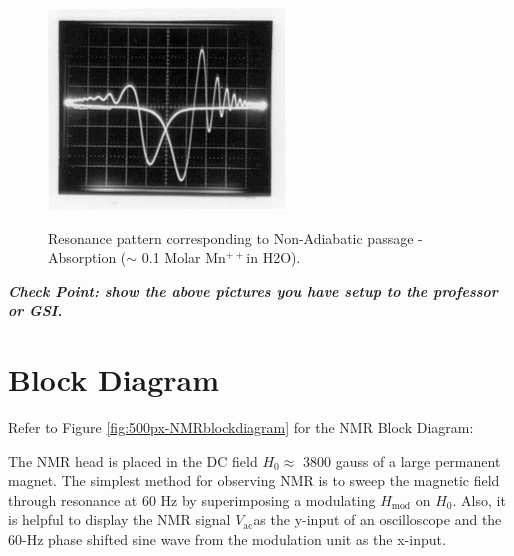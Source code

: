 \documentclass{../lab}
\begin{document}
\begin{figure}[h]
\begin{minipage}[t]{0.31\textwidth}
    \label{fig:AdiabaticDispersion}
\end{minipage}\hfill
\begin{minipage}[t]{0.31\textwidth}
    \href{http://experimentationlab.berkeley.edu/sites/default/files/images/NMR19.gif}{\includegraphics[width=\linewidth]{images/NMR19.png}}
    \caption{Resonance pattern corresponding to Non-Adiabatic passage - Absorption ($\sim$ 0.1 Molar Mn$^{++}$in H2O).}
    \label{fig:NonAdiabaticAbsorption}
\end{minipage}
\end{figure}

\emph{\textbf{Check Point: show the above pictures you have setup to  the professor or GSI.}}

\section{Block Diagram}

Refer to Figure \ref{fig:500px-NMRblockdiagram} for the NMR Block Diagram:

The NMR head is placed in the DC field $H_0 \approx$ 3800 gauss of a large permanent magnet. The simplest method for observing NMR is to sweep the magnetic field through resonance at 60 Hz by superimposing a modulating $H_\text{mod}$ on $H_0$. Also, it is helpful to display the NMR signal $V_\text{ac}$as the y-input of an oscilloscope and the 60-Hz phase shifted sine wave from the modulation unit as the x-input.

\newpage
\end{document}
